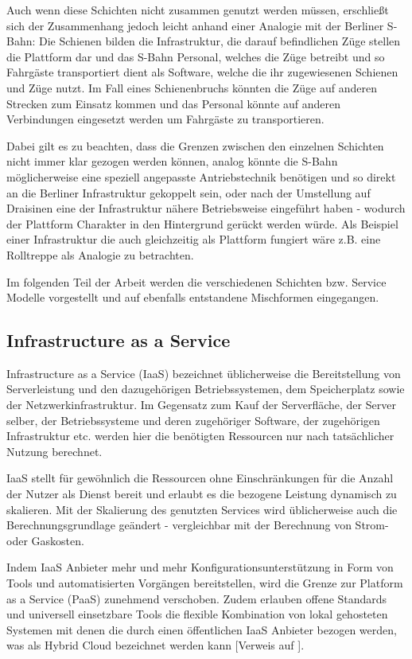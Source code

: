 \documentclass[journal]{IEEEtran}
\begin{document}
Auch wenn diese Schichten nicht zusammen genutzt werden müssen, erschließt sich der Zusammenhang jedoch leicht anhand einer Analogie mit der Berliner S-Bahn: Die Schienen bilden die Infrastruktur, die darauf befindlichen Züge stellen die Plattform dar und das S-Bahn Personal, welches die Züge betreibt und so Fahrgäste transportiert dient als Software, welche die ihr zugewiesenen Schienen und Züge nutzt. Im Fall eines Schienenbruchs könnten die Züge auf anderen Strecken zum Einsatz kommen und das Personal könnte auf anderen Verbindungen eingesetzt werden um Fahrgäste zu transportieren.

Dabei gilt es zu beachten, dass die Grenzen zwischen den einzelnen Schichten nicht immer klar gezogen werden können, analog könnte die S-Bahn möglicherweise eine speziell angepasste Antriebstechnik benötigen und so direkt an die Berliner Infrastruktur gekoppelt sein, oder nach der Umstellung auf Draisinen eine der Infrastruktur nähere Betriebsweise eingeführt haben - wodurch der Plattform Charakter in den Hintergrund gerückt werden würde. Als Beispiel einer Infrastruktur die auch gleichzeitig als Plattform fungiert wäre z.B. eine Rolltreppe als Analogie zu betrachten.

Im folgenden Teil der Arbeit werden die verschiedenen Schichten bzw. Service Modelle vorgestellt und auf ebenfalls entstandene Mischformen eingegangen.
 
\subsection{Infrastructure as a Service}
Infrastructure as a Service (IaaS) bezeichnet üblicherweise die Bereitstellung von Serverleistung und den dazugehörigen Betriebssystemen, dem Speicherplatz sowie der Netzwerkinfrastruktur. Im Gegensatz zum Kauf der Serverfläche, der Server selber, der Betriebssysteme und deren zugehöriger Software, der zugehörigen Infrastruktur etc. werden hier die benötigten Ressourcen nur nach tatsächlicher Nutzung berechnet.

IaaS stellt für gewöhnlich die Ressourcen ohne Einschränkungen für die Anzahl der Nutzer als Dienst bereit und erlaubt es die bezogene Leistung dynamisch zu skalieren. Mit der Skalierung des genutzten Services wird üblicherweise auch die Berechnungsgrundlage geändert - vergleichbar mit der Berechnung von Strom- oder Gaskosten.

Indem IaaS Anbieter mehr und mehr Konfigurationsunterstützung in Form von Tools und automatisierten Vorgängen bereitstellen, wird die Grenze zur Platform as a Service (PaaS) zunehmend verschoben. Zudem erlauben offene Standards und universell einsetzbare Tools die flexible Kombination von lokal gehosteten Systemen mit denen die durch einen öffentlichen IaaS Anbieter bezogen werden, was als Hybrid Cloud bezeichnet werden kann [Verweis auf ].
\end{document}
